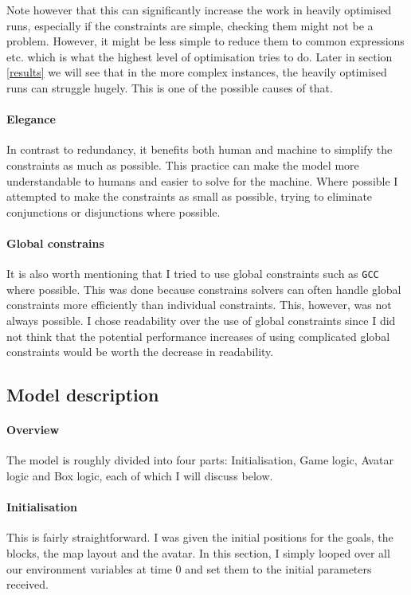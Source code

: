 \documentclass[british]{article}
\newcommand{\code}[1]{\texttt{#1}}
\begin{document}
	Note however that this can significantly increase the work in heavily optimised runs, especially if the constraints are simple, checking them might not be a problem. However, it might be less simple to reduce them to common expressions etc. which is what the highest level of optimisation tries to do. Later in section \ref{results} we will see that in the more complex instances, the heavily optimised runs can struggle hugely. This is one of the possible causes of that. 
	
	\paragraph{Elegance} In contrast to redundancy, it benefits both human and machine to simplify the constraints as much as possible. This practice can make the model more understandable to humans and easier to solve for the machine. Where possible I attempted to make the constraints as small as possible, trying to eliminate conjunctions or disjunctions where possible. 
	
	\paragraph{Global constrains} It is also worth mentioning that I tried to use global constraints such as \code{GCC} where possible. This was done because constrains solvers can often handle global constraints more efficiently than individual constraints. This, however, was not always possible. I chose readability over the use of global constraints since I did not think that the potential performance increases of using complicated global constraints would be worth the decrease in readability.
	
	\subsection{Model description}
	\paragraph{Overview} The model is roughly divided into four parts: Initialisation, Game logic, Avatar logic and Box logic, each of which I will discuss below. 
	
	\paragraph{Initialisation} This is fairly straightforward. I was given the initial positions for the goals, the blocks, the map layout and the avatar. In this section, I simply looped over all our environment variables at time 0 and set them to the initial parameters received. 
	
\end{document}
